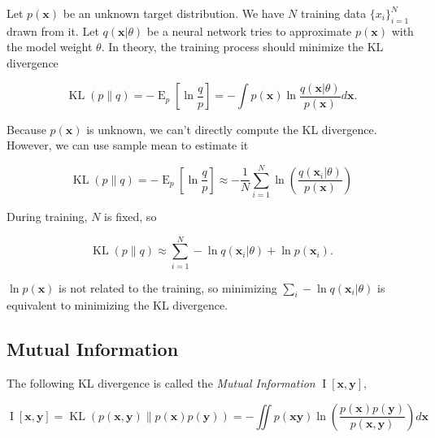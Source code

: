 \documentclass{article}
\begin{document}
            Let $ p(\mathbf{x}) $ be an unknown target distribution. We have $
            N $ training data $ \{ x_{i} \}_{i=1}^{N} $ drawn from it. Let $
            q(\mathbf{x} | \theta) $ be a neural network tries to approximate $
            p(\mathbf{x}) $ with the model weight $ \theta $. In theory, the 
            training process should minimize the KL divergence

            \begin{equation*}
                 \operatorname{KL}(p \| q) = -\operatorname{E}_{p} \left[ \ln
                 \frac{q}{p} \right] = - \int p(\mathbf{x}) \ln
                 \frac{q(\mathbf{x} | \theta)}{p(\mathbf{x})} d \mathbf{x}.
            \end{equation*}
            
            Because $ p(\mathbf{x}) $ is unknown, we can't directly compute the
            KL divergence. However, we can use sample mean to estimate it

            \begin{equation*}
                 \operatorname{KL}(p \| q) = -\operatorname{E}_{p} \left[ \ln
                 \frac{q}{p} \right] \approx -\frac{1}{N} \sum_{i=1}^{N} \ln
                 \left( \frac{q(\mathbf{x}_{i} | \theta)}{p(\mathbf{x})} \right)
            \end{equation*}

            During training, $ N $ is fixed, so

            \begin{equation*}
                 \operatorname{KL}(p \| q) \approx \sum_{i=1}^{N} -\ln
                 q(\mathbf{x}_{i} | \theta) + \ln p(\mathbf{x}_{i}).
            \end{equation*}

            $ \ln p(\mathbf{x}) $ is not related to the training, so minimizing
            $ \sum_{i} -\ln q(\mathbf{x}_{i} | \theta) $ is equivalent to
            minimizing the KL divergence.

        \subsection{Mutual Information}

           The following KL divergence is called the \textit{Mutual
           Information} $ \operatorname{I}[\mathbf{x}, \mathbf{y}] $,

           \begin{equation*}
               \operatorname{I}[\mathbf{x}, \mathbf{y}] =
               \operatorname{KL}(p(\mathbf{x}, \mathbf{y}) \| p(\mathbf{x})
               p(\mathbf{y})) = - \iint p(\mathbf{x} \mathbf{y}) \ln  \left(
                   \frac{p(\mathbf{x}) p(\mathbf{y})}{p(\mathbf{x}, \mathbf{y})}
               \right) d \mathbf{x}
           \end{equation*}
\end{document}

